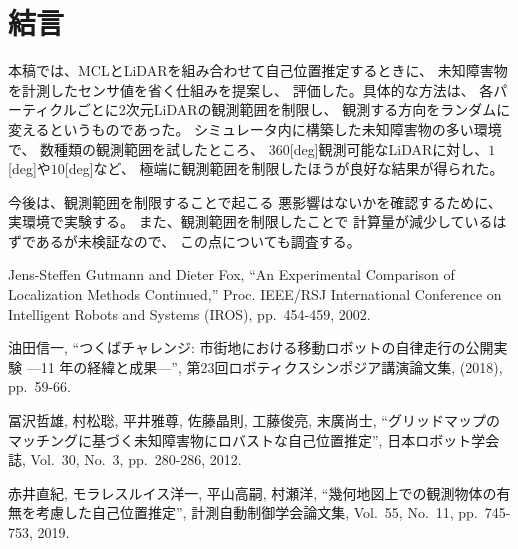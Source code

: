 \documentclass{jarticle}
\begin{document}
\section{結言}%

本稿では、MCLとLiDARを組み合わせて自己位置推定するときに、
未知障害物を計測したセンサ値を省く仕組みを提案し、
評価した。具体的な方法は、
各パーティクルごとに2次元LiDARの観測範囲を制限し、
観測する方向をランダムに変えるというものであった。
シミュレータ内に構築した未知障害物の多い環境で、
数種類の観測範囲を試したところ、
$360$[deg]観測可能なLiDARに対し、$1$[deg]や$10$[deg]など、
極端に観測範囲を制限したほうが良好な結果が得られた。


今後は、観測範囲を制限することで起こる
悪影響はないかを確認するために、
実環境で実験する。
また、観測範囲を制限したことで
計算量が減少しているはずであるが未検証なので、
この点についても調査する。




\footnotesize
\begin{thebibliography}{99}

  Jens-Steffen Gutmann and Dieter Fox, 
  ``An Experimental Comparison of Localization Methods Continued,''
  Proc. IEEE/RSJ International Conference on Intelligent Robots and Systems (IROS), pp.~454-459, 2002.

  油田信一, ``つくばチャレンジ: 市街地における移動ロボットの自律走行の公開実験 ---11 年の経緯と成果---'',
  第23回ロボティクスシンポジア講演論文集, (2018), pp.~59-66.
  
  冨沢哲雄, 村松聡, 平井雅尊, 佐藤晶則, 工藤俊亮, 末廣尚士, 
  ``グリッドマップのマッチングに基づく未知障害物にロバストな自己位置推定'', 日本ロボット学会誌, Vol.~30, No.~3, pp.~280-286, 2012.
  
  赤井直紀, モラレスルイス洋一, 平山高嗣, 村瀬洋, 
  ``幾何地図上での観測物体の有無を考慮した自己位置推定'', 計測自動制御学会論文集, Vol.~55, No.~11, pp.~745-753, 2019.
  

\end{thebibliography}

\normalsize
\end{document}
